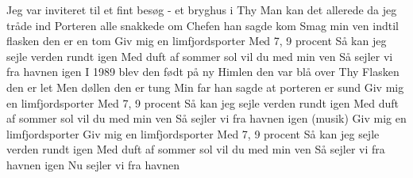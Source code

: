 Jeg var inviteret til et fint besøg - et bryghus i Thy
Man kan det allerede da jeg tråde ind
Porteren alle snakkede om
Chefen han sagde kom
Smag min ven indtil flasken den er en tom
Giv mig en limfjordsporter
Med 7, 9 procent
Så kan jeg sejle verden rundt igen
Med duft af sommer sol vil du med min ven
Så sejler vi fra havnen igen
I 1989 blev den født på ny
Himlen den var blå over Thy
Flasken den er let
Men døllen den er tung
Min far han sagde at porteren er sund
Giv mig en limfjordsporter
Med 7, 9 procent
Så kan jeg sejle verden rundt igen
Med duft af sommer sol vil du med min ven
Så sejler vi fra havnen igen
(musik)
Giv mig en limfjordsporter
Giv mig en limfjordsporter
Med 7, 9 procent
Så kan jeg sejle verden rundt igen
Med duft af sommer sol vil du med min ven
Så sejler vi fra havnen igen
Nu sejler vi fra havnen
